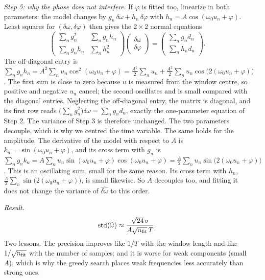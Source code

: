 \emph{Step 5: why the phase does not interfere.} If $\varphi$ is fitted too, linearize in both parameters: the model changes by $g_n\,\delta\omega+h_n\,\delta\varphi$ with $h_n=A\cos(\omega_0u_n+\varphi)$. Least squares for $(\delta\omega,\delta\varphi)$ then gives the $2\times2$ normal equations
\begin{equation}
\begin{pmatrix}\sum_ng_n^2&\sum_ng_nh_n\\ \sum_ng_nh_n&\sum_nh_n^2\end{pmatrix}\begin{pmatrix}\delta\omega\\ \delta\varphi\end{pmatrix}=\begin{pmatrix}\sum_ng_nd_n\\ \sum_nh_nd_n\end{pmatrix}.
\end{equation}
The off-diagonal entry is $\sum_ng_nh_n=A^2\sum_nu_n\cos^2(\omega_0u_n+\varphi)=\tfrac{A^2}{2}\sum_nu_n+\tfrac{A^2}{2}\sum_nu_n\cos\bigl(2(\omega_0u_n+\varphi)\bigr)$. The first sum is close to zero because $u$ is measured from the window centre, so positive and negative $u_n$ cancel; the second oscillates and is small compared with the diagonal entries. Neglecting the off-diagonal entry, the matrix is diagonal, and its first row reads $\bigl(\sum_ng_n^2\bigr)\delta\omega=\sum_ng_nd_n$, exactly the one-parameter equation of Step 2. The variance of Step 3 is therefore unchanged. The two parameters decouple, which is why we centred the time variable. The same holds for the amplitude. The derivative of the model with respect to $A$ is $k_n=\sin(\omega_0u_n+\varphi)$, and its cross term with $g_n$ is $\sum_ng_nk_n=A\sum_nu_n\sin(\omega_0u_n+\varphi)\cos(\omega_0u_n+\varphi)=\tfrac A2\sum_nu_n\sin\bigl(2(\omega_0u_n+\varphi)\bigr)$. This is an oscillating sum, small for the same reason. Its cross term with $h_n$, $\tfrac A2\sum_n\sin\bigl(2(\omega_0u_n+\varphi)\bigr)$, is small likewise. So $A$ decouples too, and fitting it does not change the variance of $\widehat{\delta\omega}$ to this order.

\emph{Result.}
\begin{equation}
\mathrm{std}(\widehat\omega)\approx\frac{\sqrt{24}\,\sigma}{A\sqrt{n_{\rm fit}}\,T}.
\label{eq:sparse-frequency-varomega}
\end{equation}
Two lessons. The precision improves like $1/T$ with the window length and like $1/\sqrt{n_{\rm fit}}$ with the number of samples; and it is worse for weak components (small $A$), which is why the greedy search places weak frequencies less accurately than strong ones.

